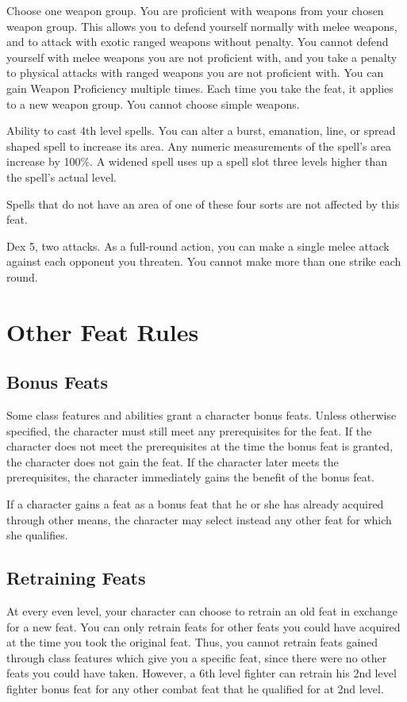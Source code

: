 Choose one weapon group.
\featben You are proficient with weapons from your chosen weapon group.
This allows you to defend yourself normally with melee weapons, and to attack with exotic ranged weapons without penalty.
You cannot defend yourself with melee weapons you are not proficient with, and you take a  penalty to physical attacks with ranged weapons you are not proficient with.
You can gain Weapon Proficiency multiple times.
Each time you take the feat, it applies to a new weapon group.
You cannot choose simple weapons.

\featpre Ability to cast 4th level spells.
\featben You can alter a burst, emanation, line, or spread shaped spell to increase its area.
Any numeric measurements of the spell's area increase by 100\%.
A widened spell uses up a spell slot three levels higher than the spell's actual level.
\par Spells that do not have an area of one of these four sorts are not affected by this feat.

\featpres
Dex 5, two attacks.
\featben As a full-round action, you can make a single melee attack against each opponent you threaten.
You cannot make more than one strike each round.

\section{Other Feat Rules}

\subsection{Bonus Feats}
Some class features and abilities grant a character bonus feats.
Unless otherwise specified, the character must still meet any prerequisites for the feat.
If the character does not meet the prerequisites at the time the bonus feat is granted, the character does not gain the feat.
If the character later meets the prerequisites, the character immediately gains the benefit of the bonus feat.

If a character gains a feat as a bonus feat that he or she has already acquired through other means, the character may select instead any other feat for which she qualifies.

\subsection{Retraining Feats}
At every even level, your character can choose to retrain an old feat in exchange for a new feat.
You can only retrain feats for other feats you could have acquired at the time you took the original feat.
Thus, you cannot retrain feats gained through class features which give you a specific feat, since there were no other feats you could have taken.
However, a 6th level fighter can retrain his 2nd level fighter bonus feat for any other combat feat that he qualified for at 2nd level.

